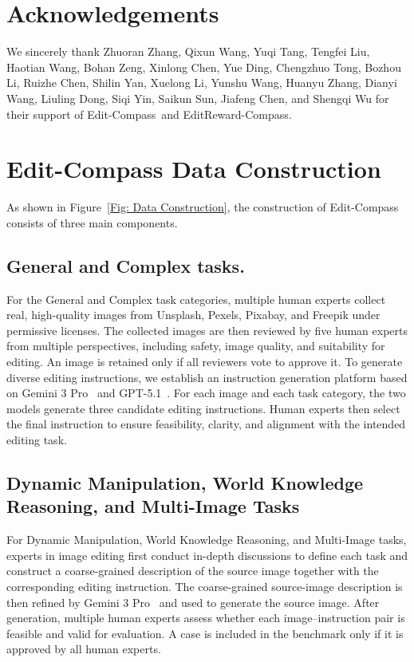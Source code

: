 \documentclass{llmxive}
\providecommand{\bench}{Edit-Compass}
\providecommand{\rmbench}{EditReward-Compass}
\begin{document}
\section{Acknowledgements}
We sincerely thank Zhuoran Zhang, Qixun Wang, Yuqi Tang, Tengfei Liu, Haotian Wang, Bohan Zeng, Xinlong Chen, Yue Ding, Chengzhuo Tong, Bozhou Li, Ruizhe Chen, Shilin Yan, Xuelong Li, Yunshu Wang, Huanyu Zhang, Dianyi Wang, Liuling Dong, Siqi Yin, Saikun Sun, Jiafeng Chen, and Shengqi Wu for their support of \bench\ and \rmbench. 







\appendix

\section{{\bench} Data Construction}
\label{supp: Edit-Compass Data Construction}
As shown in Figure~\ref{Fig: Data Construction}, the construction of {\bench} consists of three main components.

\subsection{General and  Complex tasks.}
For the General and Complex task categories, multiple human experts collect real, high-quality images from Unsplash, Pexels, Pixabay, and Freepik under permissive licenses. The collected images are then reviewed by five human experts from multiple perspectives, including safety, image quality, and suitability for editing. An image is retained only if all reviewers vote to approve it. To generate diverse editing instructions, we establish an instruction generation platform based on Gemini 3 Pro~\cite{gemini3pro} and GPT-5.1~\cite{openai2025gpt51}. For each image and each task category, the two models generate three candidate editing instructions. Human experts then select the final instruction to ensure feasibility, clarity, and alignment with the intended editing task.

\subsection{Dynamic Manipulation, World Knowledge Reasoning, and Multi-Image Tasks}
For Dynamic Manipulation, World Knowledge Reasoning, and Multi-Image tasks, experts in image editing first conduct in-depth discussions to define each task and construct a coarse-grained description of the source image together with the corresponding editing instruction. The coarse-grained source-image description is then refined by Gemini 3 Pro~\cite{gemini3pro} and used to generate the source image. After generation, multiple human experts assess whether each image--instruction pair is feasible and valid for evaluation. A case is included in the benchmark only if it is approved by all human experts.
\end{document}

